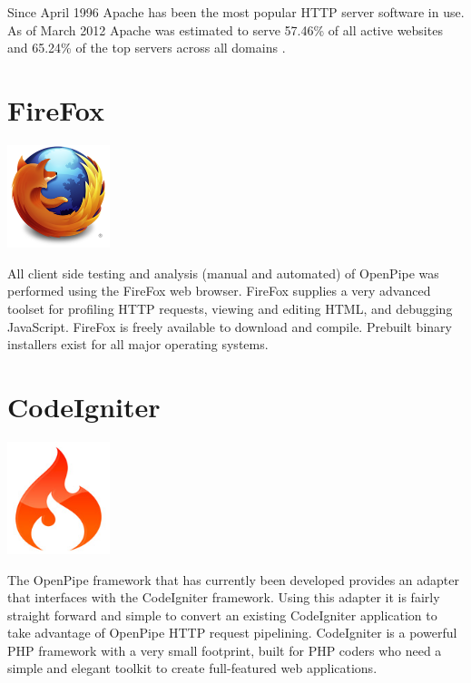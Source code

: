 \documentclass[12pt]{report}
\begin{document}
Since April 1996 Apache has been the most popular HTTP server software in use. As of March 2012 Apache was estimated to serve 57.46\% of all active websites and 65.24\% of the top servers across all domains \cite{webserverSurvey}.


\section{FireFox}
\begin{center} 
\includegraphics[width=30mm]{figures/images/firefox_logo.png}
\end{center}

All client side testing and analysis (manual and automated) of OpenPipe was performed using the FireFox web browser. FireFox supplies a very advanced toolset for profiling HTTP requests, viewing and editing HTML, and debugging JavaScript. FireFox is freely available to download and compile. Prebuilt binary installers exist for all major operating systems. 
 

\section{CodeIgniter}
\begin{center}
\includegraphics[width=30mm]{figures/images/ci_logo.jpg}
\end{center}

The OpenPipe framework that has currently been developed provides an adapter that interfaces with the CodeIgniter framework. Using this adapter it is fairly straight forward and simple to convert an existing CodeIgniter application to take advantage of OpenPipe HTTP request pipelining. CodeIgniter is a powerful PHP framework with a very small footprint, built for PHP coders who need a simple and elegant toolkit to create full-featured web applications. 
\end{document}
